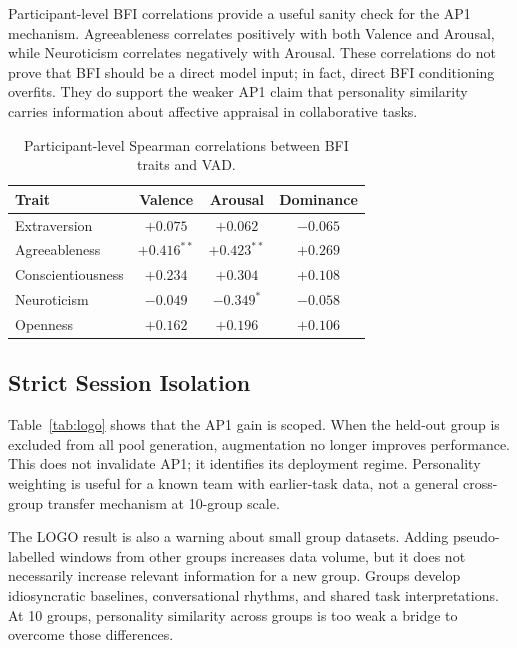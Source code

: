\documentclass[sigconf,review,anonymous]{acmart}
\begin{document}
Participant-level BFI correlations provide a useful sanity check for the AP1
mechanism.
Agreeableness correlates positively with both Valence and Arousal, while
Neuroticism correlates negatively with Arousal.
These correlations do not prove that BFI should be a direct model input; in
fact, direct BFI conditioning overfits.
They do support the weaker AP1 claim that personality similarity carries
information about affective appraisal in collaborative tasks.

\begin{table}[t]
\caption{Participant-level Spearman correlations between BFI traits and VAD.}
\label{tab:bfi_corr_short}
\centering
\setlength{\tabcolsep}{4pt}
\small
\begin{tabular}{lccc}
\toprule
\textbf{Trait} & \textbf{Valence} & \textbf{Arousal} & \textbf{Dominance} \\
\midrule
Extraversion      & $+0.075$ & $+0.062$ & $-0.065$ \\
Agreeableness     & $+0.416^{**}$ & $+0.423^{**}$ & $+0.269$ \\
Conscientiousness & $+0.234$ & $+0.304$ & $+0.108$ \\
Neuroticism       & $-0.049$ & $-0.349^{*}$ & $-0.058$ \\
Openness          & $+0.162$ & $+0.196$ & $+0.106$ \\
\bottomrule
\end{tabular}
\end{table}

\subsection{Strict Session Isolation}
\label{sec:logo}

Table~\ref{tab:logo} shows that the AP1 gain is scoped.
When the held-out group is excluded from all pool generation, augmentation no
longer improves performance.
This does not invalidate AP1; it identifies its deployment regime.
Personality weighting is useful for a known team with earlier-task data, not a
general cross-group transfer mechanism at 10-group scale.

The LOGO result is also a warning about small group datasets.
Adding pseudo-labelled windows from other groups increases data volume, but it
does not necessarily increase relevant information for a new group.
Groups develop idiosyncratic baselines, conversational rhythms, and shared
task interpretations.
At 10 groups, personality similarity across groups is too weak a bridge to
overcome those differences.
\end{document}

